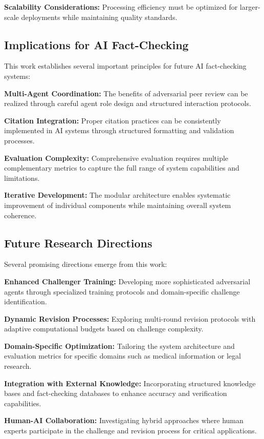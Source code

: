 \documentclass{article}
\begin{document}
\textbf{Scalability Considerations:} Processing efficiency must be optimized for larger-scale deployments while maintaining quality standards.

\subsection{Implications for AI Fact-Checking}

This work establishes several important principles for future AI fact-checking systems:

\textbf{Multi-Agent Coordination:} The benefits of adversarial peer review can be realized through careful agent role design and structured interaction protocols.

\textbf{Citation Integration:} Proper citation practices can be consistently implemented in AI systems through structured formatting and validation processes.

\textbf{Evaluation Complexity:} Comprehensive evaluation requires multiple complementary metrics to capture the full range of system capabilities and limitations.

\textbf{Iterative Development:} The modular architecture enables systematic improvement of individual components while maintaining overall system coherence.

\subsection{Future Research Directions}

Several promising directions emerge from this work:

\textbf{Enhanced Challenger Training:} Developing more sophisticated adversarial agents through specialized training protocols and domain-specific challenge identification.

\textbf{Dynamic Revision Processes:} Exploring multi-round revision protocols with adaptive computational budgets based on challenge complexity.

\textbf{Domain-Specific Optimization:} Tailoring the system architecture and evaluation metrics for specific domains such as medical information or legal research.

\textbf{Integration with External Knowledge:} Incorporating structured knowledge bases and fact-checking databases to enhance accuracy and verification capabilities.

\textbf{Human-AI Collaboration:} Investigating hybrid approaches where human experts participate in the challenge and revision process for critical applications.
\end{document}
